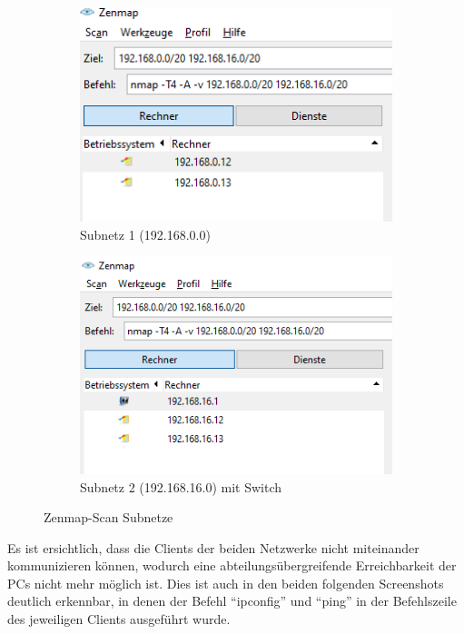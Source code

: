        \begin{figure}[H]
        \centering
            \begin{subfigure}{.5\textwidth}
              \centering
              \includegraphics[scale=0.7]{images/Unterteilung in Subnetze/Scan_Subnetz_1.png}
              \caption{Subnetz 1 (192.168.0.0)}
            \end{subfigure}%
            \begin{subfigure}{.5\textwidth}
              \centering
              \includegraphics[scale=0.7]{images/Unterteilung in Subnetze/Scan_Subnetz_2.png}
              \caption{Subnetz 2 (192.168.16.0) mit Switch}
            \end{subfigure}
        \caption{Zenmap-Scan Subnetze}
        \end{figure}
        
        Es ist ersichtlich, dass die Clients der beiden Netzwerke nicht miteinander kommunizieren können, wodurch eine abteilungsübergreifende 
        Erreichbarkeit der PCs nicht mehr möglich ist. Dies ist auch in den beiden folgenden Screenshots deutlich erkennbar, 
        in denen der Befehl "`ipconfig"' und "`ping"' in der Befehlszeile des jeweiligen Clients ausgeführt wurde.
        
